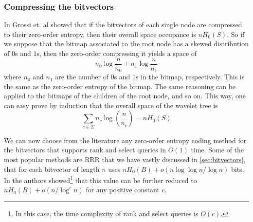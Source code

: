 \subsubsection{Compressing the bitvectors} \label{subsec:compressing_bitvectors}
In \cite{GrossiWT2003} Grossi et. al showed that if the bitvectors of each single node are compressed to their zero-order entropy, then their overall space occupance is $n H_0(S)$. So if we suppose that the bitmap associated to the root node has a skewed distribution of $0$s and $1$s, then the zero-order compressing it yields a space of
\begin{equation}
    n_0 \log \frac{n}{n_0} + n_1 \log \frac{n}{n_1}
\end{equation}
where $n_0$ and $n_1$ are the number of $0$s and $1$s in the bitmap, respectively. This is the same as the zero-order entropy of the bitmap. The same reasoning can be applied to the bitmaps of the children of the root node, and so on. This way, one can easy prove by induction \cite{navarro2016compact} that the overall space of the wavelet tree is
\begin{equation}
    \sum_{c \in \Sigma} n_c \log (\frac{n}{n_c}) = n H_0(S)
\end{equation}

\noindent We can now choose from the literature any zero-order entropy coding method for the bitvectors that supports rank and select queries in $O(1)$ time. Some of the most popular methods are RRR \cite{RRR2002} that we have vastly discussed in \autoref{sec:bitvectors}, that for each bitvector of length $n$ uses $n H_0(B) + o(n \log \log n / \log n)$ bits. In \cite{patrascu2008succincter} the authors showed\footnote{In this case, the time complexity of rank and select queries is $O(c)$.} that this value can be further reduced to $n H_0(B) + o(n/\log^c n)$ for any positive constant $c$.

